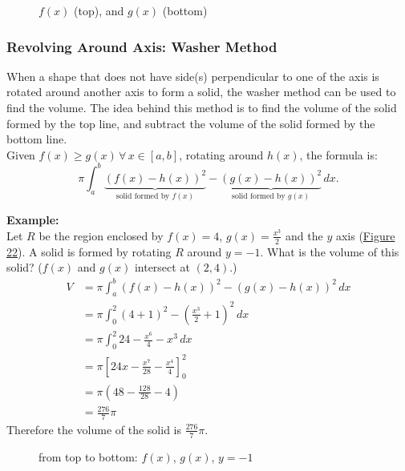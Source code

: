 \documentclass[12pt]{article}
\begin{document}
\begin{figure}[H]
    \begin{center}
        \caption{$f(x)$ (top), and $g(x)$ (bottom)}
        \label{fig:disc}
    \end{center}
\end{figure}

\subsubsection{Revolving Around Axis: Washer Method}
When a shape that does not have side(s) perpendicular to one of the axis is rotated around another axis to form a solid, the washer method can be used to find the volume. The idea behind this method is to find the volume of the solid formed by the top line, and subtract the volume of the solid formed by the bottom line.
\\ Given $f(x) \ge g(x) \, \forall \, x \in [a, b]$, rotating around $h(x)$, the formula is:
\[ \pi \int_a^b \underbrace{\left( f(x) - h(x) \right)^2}_{\text{solid formed by $f(x)$}} - \underbrace{\left( g(x) - h(x) \right)^2}_{\text{solid formed by $g(x)$}} \, dx.\]

\noindent \textbf{Example:}
\\ Let $R$ be the region enclosed by $f(x) = 4$, $g(x) = \frac{x^3}{2}$ and the $y$ axis (\hyperref[fig:washer]{Figure 22}). A solid is formed by rotating $R$ around $y=-1$. What is the volume of this solid? ($f(x)$ and $g(x)$ intersect at $(2, 4)$.)
\begin{align*}
    V & = \pi \int_a^b \left( f(x) - h(x) \right)^2 - \left( g(x) - h(x) \right)^2 \, dx \\
      & = \pi \int_0^2 (4+1)^2 - \left( \frac{x^3}{2} + 1 \right)^2 \, dx                \\[6pt]
      & = \pi \int_0^2 24 - \frac{x^6}{4} - x^3 \, dx                                    \\[6pt]
      & = \pi \left[ 24x - \frac{x^7}{28} - \frac{x^4}{4} \right]_0^2                    \\[6pt]
      & = \pi \left( 48 - \frac{128}{28} - 4 \right)                                     \\[6pt]
      & = \frac{276}{7} \pi
\end{align*}
Therefore the volume of the solid is $\frac{276}{7} \pi$.

\begin{figure}[H]
    \begin{center}
        \caption{from top to bottom: $f(x)$, $g(x)$, $y=-1$}
        \label{fig:washer}
    \end{center}
\end{figure}
\end{document}
